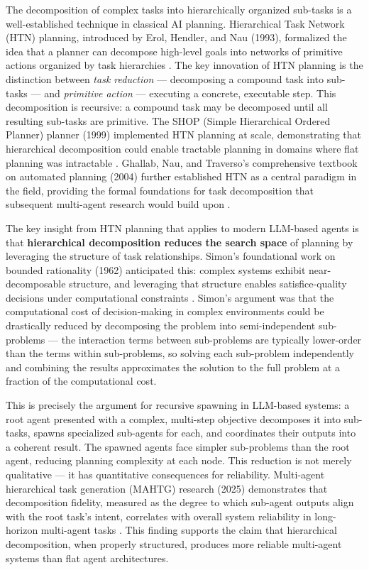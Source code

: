 The decomposition of complex tasks into hierarchically organized sub-tasks is a well-established technique in classical AI planning. Hierarchical Task Network (HTN) planning, introduced by Erol, Hendler, and Nau (1993), formalized the idea that a planner can decompose high-level goals into networks of primitive actions organized by task hierarchies \cite{htn1993}. The key innovation of HTN planning is the distinction between \textit{task reduction} — decomposing a compound task into sub-tasks — and \textit{primitive action} — executing a concrete, executable step. This decomposition is recursive: a compound task may be decomposed until all resulting sub-tasks are primitive. The SHOP (Simple Hierarchical Ordered Planner) planner (1999) implemented HTN planning at scale, demonstrating that hierarchical decomposition could enable tractable planning in domains where flat planning was intractable \cite{htn-shop}. Ghallab, Nau, and Traverso's comprehensive textbook on automated planning (2004) further established HTN as a central paradigm in the field, providing the formal foundations for task decomposition that subsequent multi-agent research would build upon \cite{erpl}.

The key insight from HTN planning that applies to modern LLM-based agents is that \textbf{hierarchical decomposition reduces the search space} of planning by leveraging the structure of task relationships. Simon's foundational work on bounded rationality (1962) anticipated this: complex systems exhibit near-decomposable structure, and leveraging that structure enables satisfice-quality decisions under computational constraints \cite{simon1962bounded}. Simon's argument was that the computational cost of decision-making in complex environments could be drastically reduced by decomposing the problem into semi-independent sub-problems — the interaction terms between sub-problems are typically lower-order than the terms within sub-problems, so solving each sub-problem independently and combining the results approximates the solution to the full problem at a fraction of the computational cost.

This is precisely the argument for recursive spawning in LLM-based systems: a root agent presented with a complex, multi-step objective decomposes it into sub-tasks, spawns specialized sub-agents for each, and coordinates their outputs into a coherent result. The spawned agents face simpler sub-problems than the root agent, reducing planning complexity at each node. This reduction is not merely qualitative — it has quantitative consequences for reliability. Multi-agent hierarchical task generation (MAHTG) research (2025) demonstrates that decomposition fidelity, measured as the degree to which sub-agent outputs align with the root task's intent, correlates with overall system reliability in long-horizon multi-agent tasks \cite{mahtg2025}. This finding supports the claim that hierarchical decomposition, when properly structured, produces more reliable multi-agent systems than flat agent architectures.

